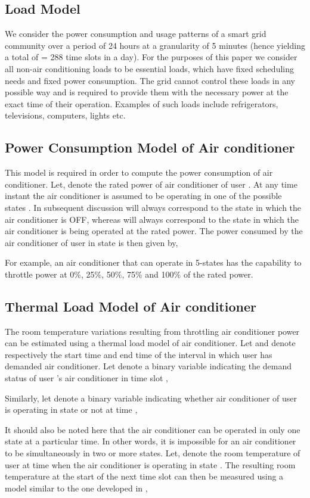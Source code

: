 \documentclass[10pt,twocolumn,twoside]{IEEEtran}
\begin{document}
\subsection{Load Model}
We consider the power consumption and usage patterns of a smart grid community over a period of 24 hours at a granularity of 5 minutes (hence yielding a total of  = 288 time slots in a day). For the purposes of this paper we consider all non-air conditioning loads to be essential loads, which have fixed scheduling needs and fixed power consumption. The grid cannot control these loads in any possible way and is required to provide them with the necessary power at the exact time of their operation. Examples of such loads include refrigerators, televisions, computers, lights etc. 

\subsection{Power Consumption Model of Air conditioner}
This model is required in order to compute the power consumption of air conditioner. Let,  denote the rated power of air conditioner of user . At any time instant  the air conditioner is assumed to be operating in one of the possible states . In subsequent discussion  will always correspond to the state in which the air conditioner is OFF, whereas  will always correspond to the state in which the air conditioner is being operated at the rated power. The power  consumed by the air conditioner of user  in state  is then given by,

For example, an air conditioner that can operate in 5-states has the capability to throttle power at 0\%, 25\%, 50\%, 75\% and 100\% of the rated power. 

\subsection{Thermal Load Model of Air conditioner}
The room temperature variations resulting from throttling air conditioner power can be estimated using a thermal load model of air conditioner. 
Let  and  denote respectively the start time and end time of the interval in which user  has demanded air conditioner. Let  denote a binary variable indicating the demand status of user 's air conditioner in time slot ,
\begin{center}

\end{center}
Similarly, let  denote a binary variable indicating whether air conditioner of user  is operating in state  or not at time ,
\begin{center}

\end{center}
It should also be noted here that the air conditioner can be operated in only one state at a particular time. In other words, it is impossible for an air conditioner to be simultaneously in two or more states. Let,  denote the room temperature of user  at time  when the air conditioner is operating in state . The resulting room temperature at the start of the next time slot  can then be measured using a model similar to the one developed in \cite{g14},
\end{document}
